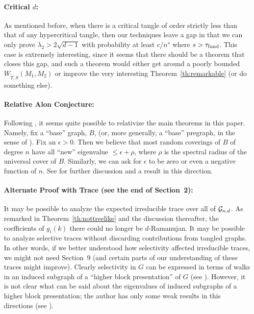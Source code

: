 \documentclass[12pt]{article}
\newcommand{\dtreelike}{{$d$-Ramanujan}}
\newcommand{\cg}{{\cal G}}
\newcommand{\cgnd}{\cg_{n,d}}
\newcommand{\fund}{{\rm fund}}
\newcommand{\taufund}{{\tau_\fund}}
\begin{document}
\paragraph{Critical $d$:}
As mentioned before, when there is a critical tangle of order
strictly less than that of any hypercritical tangle, then our techniques
leave a gap in that we can only prove $\lambda_2>2\sqrt{d-1}$ with
probability at least $c/n^s$ where $s>\taufund$.  This case is extremely
interesting, since it seems that there should be a theorem that closes
this gap, and such a theorem would either get around a poorly bounded
$W_{\widetilde T,S}(M_1,M_2)$ or improve the very interesting
Theorem~\ref{th:remarkable} (or do something else).


\paragraph{Relative Alon Conjecture:}
Following \cite{friedman_relative}, it seems quite possible to
relativize the main theorems in this paper.  Namely, fix a 
``base'' graph, $B$, (or, more generally, a ``base''
pregraph, in the sense of 
\cite{friedman_geometric_aspects}).  Fix an $\epsilon>0$.  Then we
believe that most
random coverings of $B$ of degree $n$ have all ``new'' eigenvalue
$\le \epsilon+\rho$, where $\rho$ is the spectral radius of the
universal cover of $B$.  Similarly, we can ask for $\epsilon$
to be zero or even a negative function of $n$.  See
\cite{friedman_relative,friedman_tillich_generalized} for further
discussion and a result in this direction.


\paragraph{Alternate Proof with Trace (see the end of Section~2):}
It may be possible to analyze the expected irreducible trace over all
of $\cgnd$.  As remarked in Theorem~\ref{th:nottreelike} and the
discussion thereafter, the coefficients of $g_i(k)$ there could no
longer be {\dtreelike}.
It may be possible to analyze selective traces without discarding 
contributions from tangled graphs.  In other words, if we better 
understood how selectivity affected irreducible traces, we might
not need Section~9 (and certain parts of our understanding of
these traces might improve).  Clearly selectivity in $G$ can be
expressed in terms of walks in an induced subgraph of a ``higher block
presentation'' of $G$ (see \cite{marcus,kitchens}).
However, it is not clear what can be said about the eigenvalues
of induced subgraphs of a higher block presentation; the author has
only some weak results in this directions
(see \cite{friedman_SVD}).
\end{document}
